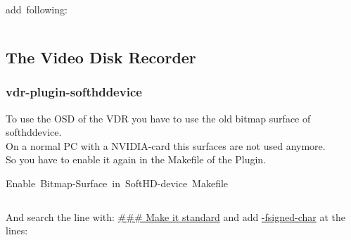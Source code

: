 \documentclass[11pt, a4paper,ngerman]{article}
\begin{document}
\begin{mintedbox}[breakable=true,
 bottomrule=0.5mm,
 width=\paperwidth-3cm,
 boxsep=1mm, 
 enhanced=true,
 colframe = monoblack,
 drop fuzzy shadow,
 colback = black
 ]{add\ following:}%
 

     \inputminted[firstline=8,lastline=25, 
     linenos=true, framesep=2mm, mathescape, numbersep=5pt,tabsize=4,%
]{bash}{includes/modules.sh}%

\end{mintedbox}%



%
%
\newpage %

\subsection{The Video Disk Recorder}

\subsubsection{vdr-plugin-softhddevice}

To use the OSD of the VDR you have to use the old bitmap surface of softhddevice. \\
On a normal PC with a NVIDIA-card this surfaces are not used anymore. \\

So you have to enable it again in the Makefile of the Plugin. \\

\begin{mintedbox}[breakable=true,
 bottomrule=0.5mm,
 width=\paperwidth-3cm,
 boxsep=1mm, 
 enhanced=true,
 colframe = monoblack,
 drop fuzzy shadow,
 colback = black
 ]{Enable\ Bitmap-Surface\ in\ SoftHD-device\ Makefile}%
 

     \inputminted[firstline=32,lastline=32, 
     linenos=true, framesep=2mm, mathescape, numbersep=5pt,tabsize=4,%
]{bash}{includes/software.sh}%

\end{mintedbox}%
\vspace{0.2cm}

And search the line with: \underline{\#\#\# Make it standard} and add \underline{-fsigned-char} at the lines: \\
\end{document}
